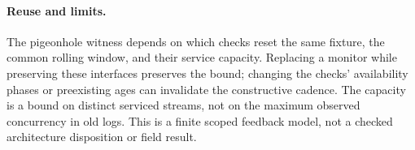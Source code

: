 \documentclass{article}
\begin{document}
\paragraph{Reuse and limits.}
The pigeonhole witness depends on which checks reset the same fixture, the
common rolling window, and their service capacity. Replacing a monitor while
preserving these interfaces preserves the bound; changing the checks'
availability phases or preexisting ages can invalidate the constructive cadence.
The capacity is a bound on distinct serviced streams, not on the maximum
observed concurrency in old logs. This is a finite scoped feedback model,
not a checked architecture disposition or field result.
\end{document}
